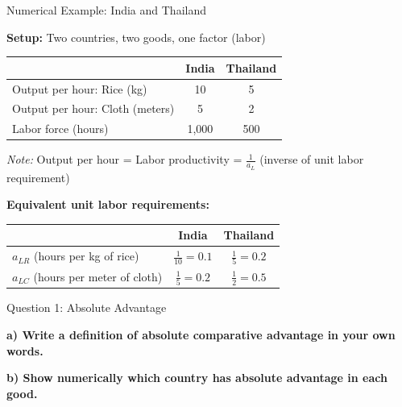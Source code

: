 \documentclass{beamer}
\begin{document}

\begin{frame}{Numerical Example: India and Thailand}

\textbf{Setup:} Two countries, two goods, one factor (labor)

\vspace{0.1cm}

\begin{center}
\begin{tabular}{lcc}
\toprule
& \textbf{India} & \textbf{Thailand} \\
\midrule
Output per hour: Rice (kg) & 10 & 5 \\
Output per hour: Cloth (meters) & 5 & 2 \\
\midrule
Labor force (hours) & 1,000 & 500 \\
\bottomrule
\end{tabular}
\end{center}

\vspace{0.3cm}

\textit{Note:} Output per hour = Labor productivity = $\frac{1}{a_L}$ (inverse of unit labor requirement)

\vspace{0.3cm}

\textbf{Equivalent unit labor requirements:}

\begin{center}
\begin{tabular}{lcc}
\toprule
& \textbf{India} & \textbf{Thailand} \\
\midrule
$a_{LR}$ (hours per kg of rice) & $\frac{1}{10} = 0.1$ & $\frac{1}{5} = 0.2$ \\
$a_{LC}$ (hours per meter of cloth) & $\frac{1}{5} = 0.2$ & $\frac{1}{2} = 0.5$ \\
\bottomrule
\end{tabular}
\end{center}

\end{frame}


\begin{frame}{Question 1: Absolute Advantage}

\textbf{a) Write a definition of absolute comparative advantage in your own words.}

\vspace{1cm}

\textbf{b) Show numerically which country has absolute advantage in each good.}

\end{frame}
\end{document}
